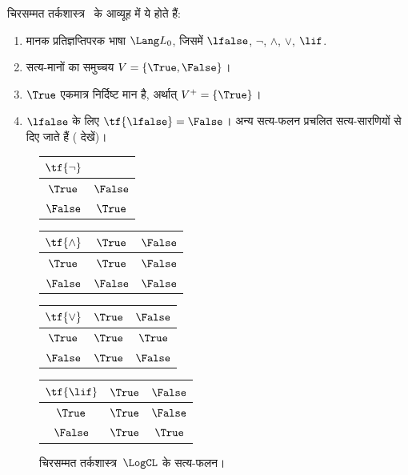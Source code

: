 \documentclass[../../../include/open-logic-section]{subfiles}
\begin{document}
\begin{ex}
चिरसम्मत तर्कशास्त्र~\LogCL{} के आव्यूह में ये होते हैं:
\begin{enumerate}
  \item मानक प्रतिज्ञप्तिपरक भाषा $\Lang L_0$, जिसमें
  $\lfalse$, $\lnot$, $\land$, $\lor$, $\lif$.
  \item सत्य-मानों का समुच्चय $V = \{\True, \False\}$।
  \item $\True$ एकमात्र निर्दिष्ट मान है, अर्थात् $V^+ = \{\True\}$।
  \item $\lfalse$ के लिए $\tf{\lfalse} = \False$। अन्य सत्य-फलन प्रचलित
  सत्य-सारणियों से दिए जाते हैं ( देखें)।
\end{enumerate}
\begin{figure}
  \begin{center}
      \begin{tabular}{c|c} 
        $\tf{\lnot}$ & \\ 
        \hline  
        $\True$ & $\False$ \\ 
        $\False$ & $\True$ 
      \end{tabular}
      \quad
      \begin{tabular}{c|cc} 
        $\tf{\land}$ & $\True$ & $\False$ \\ 
        \hline 
        $\True$ & $\True$ & $\False$ \\ 
        $\False$ & $\False$ & $\False$ 
      \end{tabular}
      \quad
      \begin{tabular}{c|cc} 
        $\tf{\lor}$ & $\True$ & $\False$ \\ 
        \hline 
        $\True$ & $\True$ & $\True$ \\ 
        $\False$ & $\True$ & $\False$ 
      \end{tabular}
      \quad
      \begin{tabular}{c|cc} 
        $\tf{\lif}$ & $\True$ & $\False$ \\ 
        \hline 
        $\True$ & $\True$ & $\False$ \\ 
        $\False$ & $\True$ & $\True$ 
      \end{tabular}
    \end{center} 
    \caption{चिरसम्मत तर्कशास्त्र~$\LogCL$ के सत्य-फलन।}
  \end{figure}
  \end{ex}
\end{document}
